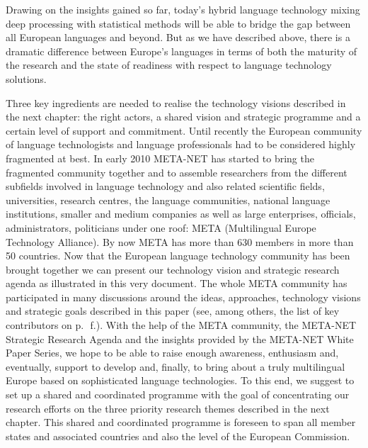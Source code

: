\documentclass[10pt, plain]{../../metanetpaper}
\begin{document}
\begin{multicols}{2}
Drawing on the insights gained so far, today’s hybrid language technology mixing deep processing with statistical methods will be able to bridge the gap between all European languages and beyond. But as we have described above, there is a dramatic difference between Europe’s languages in terms of both the maturity of the research and the state of readiness with respect to language technology solutions. 

Three key ingredients are needed to realise the technology visions described in the next chapter: the right actors, a shared vision and strategic programme and a certain level of support and commitment. Until recently the European community of language technologists and language professionals had to be considered highly fragmented at best. In early 2010 META-NET has started to bring the fragmented community together and to assemble researchers from the different subfields involved in language technology and also related scientific fields, universities, research centres, the language communities, national language institutions, smaller and medium companies as well as large enterprises, officials, administrators, politicians under one roof: META (Multilingual Europe Technology Alliance). By now META has more than 630 members in more than 50 countries. Now that the European language technology community has been brought together we can present our technology vision and strategic research agenda as illustrated in this very document. The whole META community has participated in many discussions around the ideas, approaches, technology visions and strategic goals described in this paper (see, among others, the list of key contributors on p.~\pageref{sec:list-of-contributors}\,f.). With the help of the META community, the META-NET Strategic Research Agenda and the insights provided by the META-NET White Paper Series, we hope to be able to raise enough awareness, enthusiasm and, eventually, support to develop and, finally, to bring about a truly multilingual Europe based on sophisticated language technologies. To this end, we suggest to set up a shared and coordinated programme with the goal of concentrating our research efforts on the three priority research themes described in the next chapter. This shared and coordinated programme is foreseen to span all member states and associated countries and also the level of the European Commission.



\end{multicols}
\end{document}
